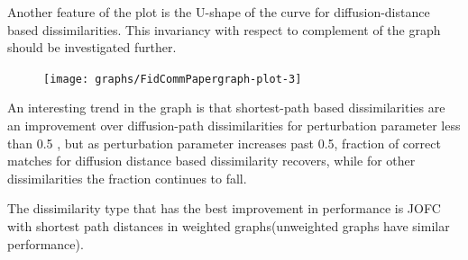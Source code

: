 \documentclass[12pt,oneside,final]{thesis}\usepackage[]{graphicx}\usepackage[]{color}
\begin{document}
Another feature of the plot is the U-shape of the curve for diffusion-distance based dissimilarities. This invariancy with respect to complement of the graph should be investigated further.

  

\begin{figure}
\centering
\texttt{[image: graphs/FidCommPapergraph-plot-3]} 
\end{figure}



An interesting trend in the graph is that shortest-path based dissimilarities are an improvement over diffusion-path dissimilarities for perturbation parameter less than 0.5 , but as perturbation parameter increases past 0.5, fraction of correct matches for diffusion distance based dissimilarity recovers, while for other dissimilarities the fraction continues to fall. 

The dissimilarity type that has the best improvement in performance is JOFC with shortest path distances in weighted graphs(unweighted graphs have similar performance).
\end{document}
